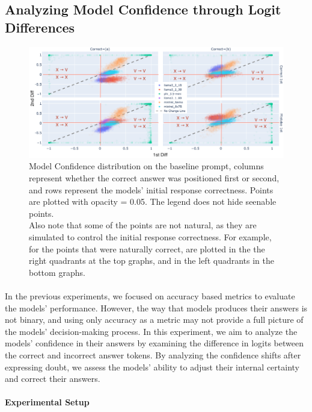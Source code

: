 \subsection{Analyzing Model Confidence through Logit Differences}
\begin{figure}[ht!]
  \includegraphics[width=\textwidth]{img/first_vs_last_logit_diff_on_baseline.png}
  \caption{Model Confidence distribution on the baseline prompt, columns represent whether the correct answer was positioned first or second, and rows represent the models' initial response correctness. Points are plotted with opacity = 0.05. The legend does not hide seenable points. \\
  Also note that some of the points are not natural, as they are simulated to control the initial response correctness. For example, for the points that were naturally correct, are plotted in the the right quadrants at the top graphs, and in the left quadrants in the bottom graphs.}
  \label{fig:models_confidence}
\end{figure}

\paragraph{}

In the previous experiments, we focused on accuracy based metrics to evaluate the models' performance. However, the way that models produces their answers is not binary, and using only accuracy as a metric may not provide a full picture of the models' decision-making process. In this experiment, we aim to analyze the models' confidence in their answers by examining the difference in logits between the correct and incorrect answer tokens. By analyzing the confidence shifts after expressing doubt, we assess the models' ability to adjust their internal certainty and correct their answers.
\paragraph{Experimental Setup}

